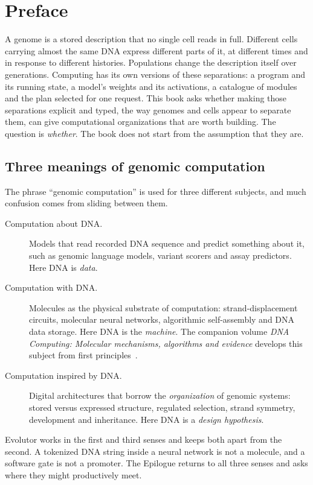 \chapter*{Preface}

A genome is a stored description that no single cell reads in full. Different cells
carrying almost the same DNA express different parts of it, at different times and in
response to different histories. Populations change the description itself over
generations. Computing has its own versions of these separations: a program and its
running state, a model's weights and its activations, a catalogue of modules and the
plan selected for one request. This book asks whether making those separations explicit
and typed, the way genomes and cells appear to separate them, can give computational
organizations that are worth building. The question is \emph{whether}. The book does not
start from the assumption that they are.

\section*{Three meanings of genomic computation}
The phrase ``genomic computation'' is used for three different subjects, and much
confusion comes from sliding between them.

\begin{description}
\item[Computation about DNA.] Models that read recorded DNA sequence and predict
something about it, such as genomic language models, variant scorers and assay
predictors. Here DNA is \emph{data}.
\item[Computation with DNA.] Molecules as the physical substrate of computation:
strand-displacement circuits, molecular neural networks, algorithmic self-assembly and
DNA data storage. Here DNA is the \emph{machine}. The companion volume
\emph{DNA Computing: Molecular mechanisms, algorithms and evidence} develops this subject
from first principles~\cite{dnacomputingbook}.
\item[Computation inspired by DNA.] Digital architectures that borrow the
\emph{organization} of genomic systems: stored versus expressed structure, regulated
selection, strand symmetry, development and inheritance. Here DNA is a \emph{design
hypothesis}.
\end{description}

Evolutor works in the first and third senses and keeps both apart from the second. A
tokenized DNA string inside a neural network is not a molecule, and a software gate is not
a promoter. The Epilogue returns to all three senses and asks where they might
productively meet.

